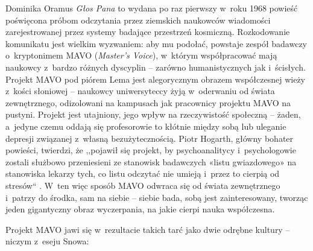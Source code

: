 \begin{artplenv}{Dominika Oramus}
\textit{Głos Pana}
\parencite[][]{lem_glos_2002} %
 to wydana po raz pierwszy w~roku 1968 powieść poświęcona próbom odczytania przez ziemskich naukowców wiadomości zarejestrowanej przez systemy badające przestrzeń kosmiczną. Rozkodowanie komunikatu jest wielkim wyzwaniem: aby mu podołać, powstaje zespół badawczy o~kryptonimem MAVO (\textit{Master’s Voice}), w~którym współpracować mają naukowcy z~bardzo różnych dyscyplin -- zarówno humanistycznych jak i~ścisłych. Projekt MAVO pod piórem Lema jest alegorycznym obrazem współczesnej wieży z~kości słoniowej -- naukowcy uniwersyteccy żyją w~oderwaniu od świata zewnętrznego, odizolowani na kampusach jak pracownicy projektu MAVO na pustyni. Projekt jest utajniony, jego wpływ na rzeczywistość społeczną -- żaden, a~jedyne czemu oddają się profesorowie to kłótnie między sobą lub uleganie depresji związanej z~własną bezużytecznością. Piotr Hogarth, główny bohater powieści, twierdzi, że ,,pojawił się projekt, by psychoanalitycy i~psychologowie zostali służbowo przeniesieni ze stanowisk badawczych «listu gwiazdowego» na stanowiska lekarzy tych, co listu odczytać nie umieją i~przez to cierpią od stresów`` 
\parencite[][s.~85]{lem_glos_2002}. %
 W~ten więc sposób MAVO odwraca się od świata zewnętrznego i~patrzy do środka, sam na siebie -- siebie bada, sobą jest zainteresowany, tworząc jeden gigantyczny obraz wyczerpania, na jakie cierpi nauka współczesna.

Projekt MAVO jawi się w~rezultacie takich tarć jako dwie odrębne kultury -- niczym z~eseju Snowa:



\end{artplenv}
